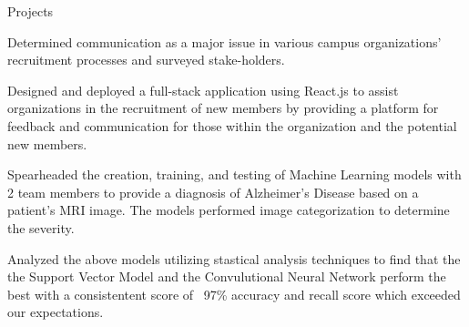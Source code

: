 \documentclass{resume} %
\begin{document}


\begin{workSection}{Projects}
     \customItem[
        title=RushKit,
        duration=July 2022 - December 2022,
        keyHighlight=Recruitment Web Application,
        location=Atlanta{,} GA
     ]
     \begin{bullets}
        \item Determined communication as a major issue in various campus organizations' recruitment processes and surveyed stake-holders.
        \item Designed and deployed a full-stack application using React.js to assist organizations in the recruitment of new members by providing a platform for feedback and communication for those within the organization and the potential new members.
     \end{bullets}

     \customItem[
        title=Alzheimer's Disease Detection Project,
        duration=August 2023 - December 2023,
        keyHighlight=Machine Learning Models,
        location=Atlanta{,} GA
     ]
     \begin{bullets}
        \item Spearheaded the creation, training, and testing of Machine Learning models with 2 team members to provide a diagnosis of Alzheimer's Disease based on a patient's MRI image. The models performed image categorization to determine the severity.
        \item Analyzed the above models utilizing stastical analysis techniques to find that the the Support Vector Model and the Convulutional Neural Network perform the best with a consistentent score of ~97\% accuracy and recall score which exceeded our expectations.
     \end{bullets}
\end{workSection}

\end{document}
